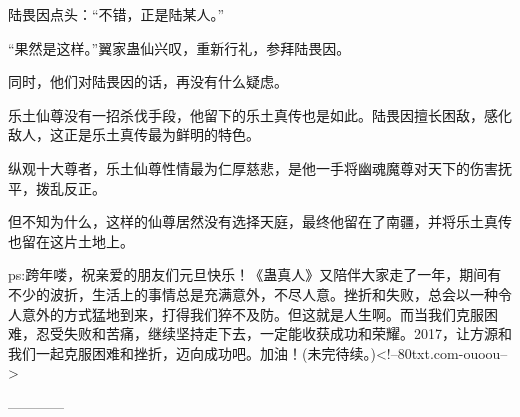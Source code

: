 \begin{this_body}
陆畏因点头：“不错，正是陆某人。”

“果然是这样。”翼家蛊仙兴叹，重新行礼，参拜陆畏因。

同时，他们对陆畏因的话，再没有什么疑虑。

乐土仙尊没有一招杀伐手段，他留下的乐土真传也是如此。陆畏因擅长困敌，感化敌人，这正是乐土真传最为鲜明的特色。

纵观十大尊者，乐土仙尊性情最为仁厚慈悲，是他一手将幽魂魔尊对天下的伤害抚平，拨乱反正。

但不知为什么，这样的仙尊居然没有选择天庭，最终他留在了南疆，并将乐土真传也留在这片土地上。

ps:跨年喽，祝亲爱的朋友们元旦快乐！《蛊真人》又陪伴大家走了一年，期间有不少的波折，生活上的事情总是充满意外，不尽人意。挫折和失败，总会以一种令人意外的方式猛地到来，打得我们猝不及防。但这就是人生啊。而当我们克服困难，忍受失败和苦痛，继续坚持走下去，一定能收获成功和荣耀。2017，让方源和我们一起克服困难和挫折，迈向成功吧。加油！(未完待续。)<!--80txt.com-ouoou-->

------------

\end{this_body}

